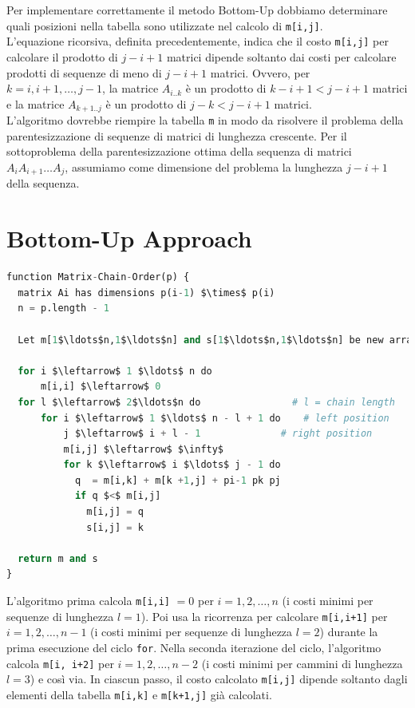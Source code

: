 Per implementare correttamente il metodo Bottom-Up dobbiamo determinare
quali posizioni nella tabella sono utilizzate nel calcolo di
\texttt{m[i,j]}.\\ L'equazione ricorsiva, definita precedentemente,
indica che il costo \texttt{m[i,j]} per calcolare il prodotto di
$j-i+1$ matrici dipende soltanto dai costi per calcolare prodotti di
sequenze di meno di $j-i+1$ matrici. Ovvero, per $k=i,i+1,\ldots,j-1$,
la matrice $A_{i..k}$ è un prodotto di $k-i+1 < j-i+1$ matrici e la
matrice $A_{k+1..j}$ è un prodotto di $j-k < j-i+1$ matrici.\\

L'algoritmo dovrebbe riempire la tabella \texttt{m} in modo da risolvere
il problema della parentesizzazione di sequenze di matrici di lunghezza
crescente. Per il sottoproblema della parentesizzazione ottima della
sequenza di matrici $A_i A_{i+1} \ldots A_j$, assumiamo come dimensione
del problema la lunghezza $j-i+1$ della sequenza.


\section{Bottom-Up Approach}

\begin{lstlisting}[language=Python, mathescape=true]
function Matrix-Chain-Order(p) {
  matrix Ai has dimensions p(i-1) $\times$ p(i)
  n = p.length - 1

  Let m[1$\ldots$n,1$\ldots$n] and s[1$\ldots$n,1$\ldots$n] be new arrays

  for i $\leftarrow$ 1 $\ldots$ n do
	  m[i,i] $\leftarrow$ 0
  for l $\leftarrow$ 2$\ldots$n do                # l = chain length
	  for i $\leftarrow$ 1 $\ldots$ n - l + 1 do    # left position 
		  j $\leftarrow$ i + l - 1              # right position
		  m[i,j] $\leftarrow$ $\infty$
		  for k $\leftarrow$ i $\ldots$ j - 1 do
            q  = m[i,k] + m[k +1,j] + pi-1 pk pj
            if q $<$ m[i,j]
              m[i,j] = q
              s[i,j] = k

  return m and s
}
\end{lstlisting}

L'algoritmo prima calcola \texttt{m[i,i]} $= 0$ per
$i=1, 2,\ldots,n$ (i costi minimi per sequenze di lunghezza $l=1$). Poi
usa la ricorrenza per calcolare \texttt{m{[}i,i+1{]}} per
$i=1,2,\ldots,n-1$ (i costi minimi per sequenze di lunghezza $l=2$)
durante la prima esecuzione del ciclo \texttt{for}. Nella seconda
iterazione del ciclo, l'algoritmo calcola \texttt{m{[}i,\ i+2{]}} per
$i =1,2,\ldots,n-2$ (i costi minimi per cammini di lunghezza $l=3$) e
così via. In ciascun passo, il costo calcolato \texttt{m{[}i,j{]}}
dipende soltanto dagli elementi della tabella \texttt{m{[}i,k{]}} e
\texttt{m{[}k+1,j{]}} già calcolati.


